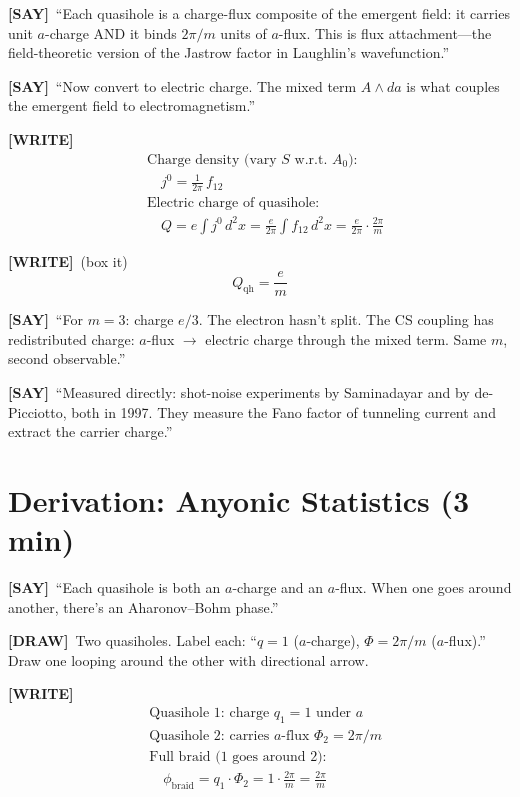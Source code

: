 \documentclass[11pt]{article}
\newcommand{\WRITE}{\textcolor{writecol}{\textbf{[WRITE]}}}
\newcommand{\SAY}{\textcolor{saycol}{\textbf{[SAY]}}}
\newcommand{\DRAW}{\textcolor{drawcol}{\textbf{[DRAW]}}}
\begin{document}
\SAY\ ``Each quasihole is a charge-flux composite of the emergent field: it carries unit $a$-charge AND it binds $2\pi/m$ units of $a$-flux. This is flux attachment---the field-theoretic version of the Jastrow factor in Laughlin's wavefunction.''

\SAY\ ``Now convert to electric charge. The mixed term $A\wedge da$ is what couples the emergent field to electromagnetism.''

\WRITE
\begin{align*}
&\text{Charge density (vary $S$ w.r.t.\ $A_0$):}\\[4pt]
&\quad j^0 = \frac{1}{2\pi}\,f_{12}\\[6pt]
&\text{Electric charge of quasihole:}\\[4pt]
&\quad Q = e\!\int\! j^0\,d^2x = \frac{e}{2\pi}\int\! f_{12}\,d^2x = \frac{e}{2\pi}\cdot\frac{2\pi}{m}
\end{align*}

\WRITE\ {\large (box it)}
\begin{equation*}
\boxed{Q_{\mathrm{qh}} = \frac{e}{m}}
\end{equation*}

\SAY\ ``For $m=3$: charge $e/3$. The electron hasn't split. The CS coupling has redistributed charge: $a$-flux $\to$ electric charge through the mixed term. Same $m$, second observable.''

\SAY\ ``Measured directly: shot-noise experiments by Saminadayar and by de-Picciotto, both in 1997. They measure the Fano factor of tunneling current and extract the carrier charge.''

\section{Derivation: Anyonic Statistics (3 min)}

\SAY\ ``Each quasihole is both an $a$-charge and an $a$-flux. When one goes around another, there's an Aharonov--Bohm phase.''

\DRAW\ Two quasiholes. Label each: ``$q=1$ ($a$-charge), $\Phi = 2\pi/m$ ($a$-flux).'' Draw one looping around the other with directional arrow.

\WRITE
\begin{align*}
&\text{Quasihole 1: charge }q_1 = 1\text{ under }a\\
&\text{Quasihole 2: carries }a\text{-flux }\Phi_2 = 2\pi/m\\[8pt]
&\text{Full braid (1 goes around 2):}\\[4pt]
&\quad\phi_{\text{braid}} = q_1\cdot\Phi_2 = 1\cdot\frac{2\pi}{m} = \frac{2\pi}{m}
\end{align*}
\end{document}
